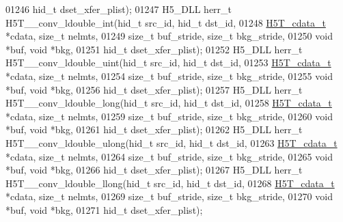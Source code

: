 \begin{DoxyCode}
01246                                      hid\_t dset\_xfer\_plist);
01247 H5\_DLL herr\_t H5T\_\_conv\_ldouble\_int(hid\_t src\_id, hid\_t dst\_id,
01248                      \hyperlink{struct_h5_t__cdata__t}{H5T\_cdata\_t} *cdata, \textcolor{keywordtype}{size\_t} nelmts,
01249                      \textcolor{keywordtype}{size\_t} buf\_stride, \textcolor{keywordtype}{size\_t} bkg\_stride,
01250                                      \textcolor{keywordtype}{void} *buf, \textcolor{keywordtype}{void} *bkg,
01251                                      hid\_t dset\_xfer\_plist);
01252 H5\_DLL herr\_t H5T\_\_conv\_ldouble\_uint(hid\_t src\_id, hid\_t dst\_id,
01253                      \hyperlink{struct_h5_t__cdata__t}{H5T\_cdata\_t} *cdata, \textcolor{keywordtype}{size\_t} nelmts,
01254                      \textcolor{keywordtype}{size\_t} buf\_stride, \textcolor{keywordtype}{size\_t} bkg\_stride,
01255                                      \textcolor{keywordtype}{void} *buf, \textcolor{keywordtype}{void} *bkg,
01256                                      hid\_t dset\_xfer\_plist);
01257 H5\_DLL herr\_t H5T\_\_conv\_ldouble\_long(hid\_t src\_id, hid\_t dst\_id,
01258                      \hyperlink{struct_h5_t__cdata__t}{H5T\_cdata\_t} *cdata, \textcolor{keywordtype}{size\_t} nelmts,
01259                      \textcolor{keywordtype}{size\_t} buf\_stride, \textcolor{keywordtype}{size\_t} bkg\_stride,
01260                                      \textcolor{keywordtype}{void} *buf, \textcolor{keywordtype}{void} *bkg,
01261                                      hid\_t dset\_xfer\_plist);
01262 H5\_DLL herr\_t H5T\_\_conv\_ldouble\_ulong(hid\_t src\_id, hid\_t dst\_id,
01263                      \hyperlink{struct_h5_t__cdata__t}{H5T\_cdata\_t} *cdata, \textcolor{keywordtype}{size\_t} nelmts,
01264                      \textcolor{keywordtype}{size\_t} buf\_stride, \textcolor{keywordtype}{size\_t} bkg\_stride,
01265                                      \textcolor{keywordtype}{void} *buf, \textcolor{keywordtype}{void} *bkg,
01266                                      hid\_t dset\_xfer\_plist);
01267 H5\_DLL herr\_t H5T\_\_conv\_ldouble\_llong(hid\_t src\_id, hid\_t dst\_id,
01268                      \hyperlink{struct_h5_t__cdata__t}{H5T\_cdata\_t} *cdata, \textcolor{keywordtype}{size\_t} nelmts,
01269                      \textcolor{keywordtype}{size\_t} buf\_stride, \textcolor{keywordtype}{size\_t} bkg\_stride,
01270                                      \textcolor{keywordtype}{void} *buf, \textcolor{keywordtype}{void} *bkg,
01271                                      hid\_t dset\_xfer\_plist);

\end{DoxyCode}
